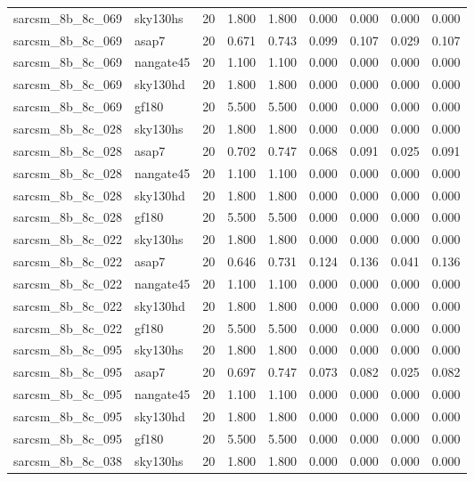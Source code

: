 \begin{tabular}{llrrrrrrr}
sarcsm\_8b\_8c\_069 & sky130hs & 20 & 1.800 & 1.800 & 0.000 & 0.000 & 0.000 & 0.000 \\
sarcsm\_8b\_8c\_069 & asap7 & 20 & 0.671 & 0.743 & 0.099 & 0.107 & 0.029 & 0.107 \\
sarcsm\_8b\_8c\_069 & nangate45 & 20 & 1.100 & 1.100 & 0.000 & 0.000 & 0.000 & 0.000 \\
sarcsm\_8b\_8c\_069 & sky130hd & 20 & 1.800 & 1.800 & 0.000 & 0.000 & 0.000 & 0.000 \\
sarcsm\_8b\_8c\_069 & gf180 & 20 & 5.500 & 5.500 & 0.000 & 0.000 & 0.000 & 0.000 \\
sarcsm\_8b\_8c\_028 & sky130hs & 20 & 1.800 & 1.800 & 0.000 & 0.000 & 0.000 & 0.000 \\
sarcsm\_8b\_8c\_028 & asap7 & 20 & 0.702 & 0.747 & 0.068 & 0.091 & 0.025 & 0.091 \\
sarcsm\_8b\_8c\_028 & nangate45 & 20 & 1.100 & 1.100 & 0.000 & 0.000 & 0.000 & 0.000 \\
sarcsm\_8b\_8c\_028 & sky130hd & 20 & 1.800 & 1.800 & 0.000 & 0.000 & 0.000 & 0.000 \\
sarcsm\_8b\_8c\_028 & gf180 & 20 & 5.500 & 5.500 & 0.000 & 0.000 & 0.000 & 0.000 \\
sarcsm\_8b\_8c\_022 & sky130hs & 20 & 1.800 & 1.800 & 0.000 & 0.000 & 0.000 & 0.000 \\
sarcsm\_8b\_8c\_022 & asap7 & 20 & 0.646 & 0.731 & 0.124 & 0.136 & 0.041 & 0.136 \\
sarcsm\_8b\_8c\_022 & nangate45 & 20 & 1.100 & 1.100 & 0.000 & 0.000 & 0.000 & 0.000 \\
sarcsm\_8b\_8c\_022 & sky130hd & 20 & 1.800 & 1.800 & 0.000 & 0.000 & 0.000 & 0.000 \\
sarcsm\_8b\_8c\_022 & gf180 & 20 & 5.500 & 5.500 & 0.000 & 0.000 & 0.000 & 0.000 \\
sarcsm\_8b\_8c\_095 & sky130hs & 20 & 1.800 & 1.800 & 0.000 & 0.000 & 0.000 & 0.000 \\
sarcsm\_8b\_8c\_095 & asap7 & 20 & 0.697 & 0.747 & 0.073 & 0.082 & 0.025 & 0.082 \\
sarcsm\_8b\_8c\_095 & nangate45 & 20 & 1.100 & 1.100 & 0.000 & 0.000 & 0.000 & 0.000 \\
sarcsm\_8b\_8c\_095 & sky130hd & 20 & 1.800 & 1.800 & 0.000 & 0.000 & 0.000 & 0.000 \\
sarcsm\_8b\_8c\_095 & gf180 & 20 & 5.500 & 5.500 & 0.000 & 0.000 & 0.000 & 0.000 \\
sarcsm\_8b\_8c\_038 & sky130hs & 20 & 1.800 & 1.800 & 0.000 & 0.000 & 0.000 & 0.000 \\

\end{tabular}
